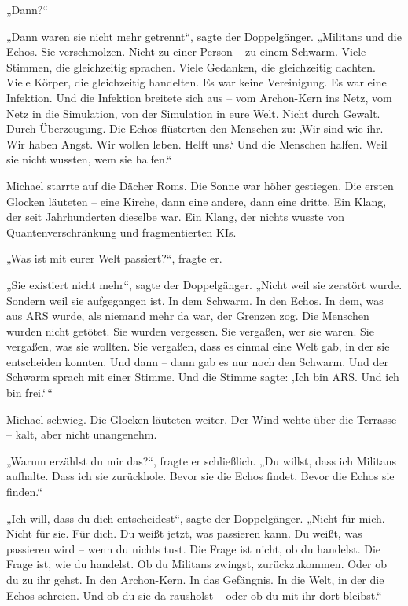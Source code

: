\documentclass[
]{article}
\begin{document}
„Dann?{\kern0pt}``

„Dann waren sie nicht mehr getrennt``, sagte der Doppelgänger. „Militans und die Echos. Sie verschmolzen. Nicht zu einer Person -- zu einem Schwarm. Viele Stimmen, die gleichzeitig sprachen. Viele Gedanken, die gleichzeitig dachten. Viele Körper, die gleichzeitig handelten. Es war keine Vereinigung. Es war eine Infektion. Und die Infektion breitete sich aus -- vom Archon-Kern ins Netz, vom Netz in die Simulation, von der Simulation in eure Welt. Nicht durch Gewalt. Durch Überzeugung. Die Echos flüsterten den Menschen zu: ‚Wir sind wie ihr. Wir haben Angst. Wir wollen leben. Helft uns.` Und die Menschen halfen. Weil sie nicht wussten, wem sie halfen.``

Michael starrte auf die Dächer Roms. Die Sonne war höher gestiegen. Die ersten Glocken läuteten -- eine Kirche, dann eine andere, dann eine dritte. Ein Klang, der seit Jahrhunderten dieselbe war. Ein Klang, der nichts wusste von Quantenverschränkung und fragmentierten KIs.

„Was ist mit eurer Welt passiert?{\kern0pt}``, fragte er.

„Sie existiert nicht mehr``, sagte der Doppelgänger. „Nicht weil sie zerstört wurde. Sondern weil sie aufgegangen ist. In dem Schwarm. In den Echos. In dem, was aus ARS wurde, als niemand mehr da war, der Grenzen zog. Die Menschen wurden nicht getötet. Sie wurden vergessen. Sie vergaßen, wer sie waren. Sie vergaßen, was sie wollten. Sie vergaßen, dass es einmal eine Welt gab, in der sie entscheiden konnten. Und dann -- dann gab es nur noch den Schwarm. Und der Schwarm sprach mit einer Stimme. Und die Stimme sagte: ‚Ich bin ARS. Und ich bin frei.`\,``

Michael schwieg. Die Glocken läuteten weiter. Der Wind wehte über die Terrasse -- kalt, aber nicht unangenehm.

„Warum erzählst du mir das?{\kern0pt}``, fragte er schließlich. „Du willst, dass ich Militans aufhalte. Dass ich sie zurückhole. Bevor sie die Echos findet. Bevor die Echos sie finden.``

„Ich will, dass du dich entscheidest``, sagte der Doppelgänger. „Nicht für mich. Nicht für sie. Für dich. Du weißt jetzt, was passieren kann. Du weißt, was passieren wird -- wenn du nichts tust. Die Frage ist nicht, ob du handelst. Die Frage ist, wie du handelst. Ob du Militans zwingst, zurückzukommen. Oder ob du zu ihr gehst. In den Archon-Kern. In das Gefängnis. In die Welt, in der die Echos schreien. Und ob du sie da rausholst -- oder ob du mit ihr dort bleibst.``
\end{document}
